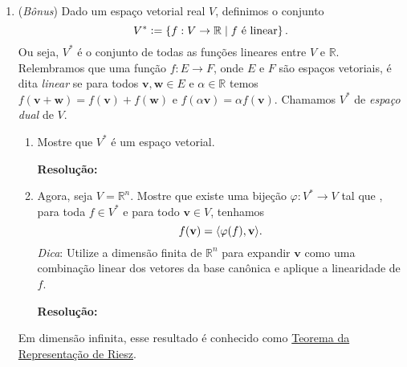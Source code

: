\documentclass[leqno]{article}
\numberwithin{equation}{section}
\newcommand{\inv}{^{\raisebox{.2ex}{$\scriptscriptstyle-1$}}}
\DeclarePairedDelimiter{\dotprod}{\langle}{\rangle}
\newcommand{\defeq}{\vcentcolon=}
\newcommand{\bfw}{\mathbf{w}}
\newcommand{\bfv}{\mathbf{v}}
\newcommand{\R}{\mathbb{R}}
\newenvironment{sol}
{
	\vspace{4mm}
	\noindent\textbf{Resolução:}
	\strut\newline
	\smallskip
	\hspace{-3.5mm}
}
{}
\begin{document}
\begin{enumerate}
		\begin{sol} 
			$AB = I$, que tem posto n. Então sabendo que $posto(AB) \leq posto (A)$, logo $posto (A) =
			n$. A é uma matriz n x n então o posto não pode ser maior que n: $posto(A) \leq n$.\\
			
			Assim, A é invertível e tem inverso único, e já que AB = I também é válido e o inverso é B. \\
			O B inverso à direita também é inverso à esquerda: $BA = I$
			e $B = A\inv$   
		\end{sol} 
		
		\item (\textit{Bônus}) Dado um espaço vetorial real \( V \), definimos o conjunto
		\begin{equation*}
			V^{ * } \defeq \left\{ f : V \to \R \mid f \text{ é linear} \right\}
			.\end{equation*}
		Ou seja, \( V^{ * } \) é o conjunto de todas as funções lineares entre \( V \) e \( \R \).
		Relembramos que uma função \( f : E \to F \), onde \( E \) e \( F \) são espaços vetoriais, é dita \textit{linear} se para todos \( \bfv, \bfw \in E \) e \( \alpha \in \R \) temos \( f ( \bfv + \bfw ) = f ( \bfv ) + f ( \bfw ) \) e \( f ( \alpha \bfv ) = \alpha f ( \bfv ) \).
		Chamamos \( V^{ * } \) de \textit{espaço dual} de \( V \).
		\begin{enumerate}
			\item Mostre que \( V^{ * } \) é um espaço vetorial.
			
			\begin{sol} 
			\end{sol} 
			
			\item Agora, seja \( V = \R^{ n } \).
			Mostre que existe uma bijeção \( \varphi : V^{ * } \to V \) tal que , para toda \( f \in V^{ * } \) e para todo \( \bfv \in V \), tenhamos
			\begin{equation*}
				f(\bfv) = \dotprod{\varphi(f), \bfv}
				.\end{equation*}
			\textit{Dica}: Utilize a dimensão finita de \( \R^{ n } \) para expandir \( \bfv \) como uma combinação linear dos vetores da base canônica e aplique a linearidade de \( f \).
			
			\begin{sol} 
			\end{sol} 
		\end{enumerate}
		Em dimensão infinita, esse resultado é conhecido como \href{https://en.wikipedia.org/wiki/Riesz_representation_theorem}{Teorema da Representação de Riesz}.
	\end{enumerate}
	
\end{document}
